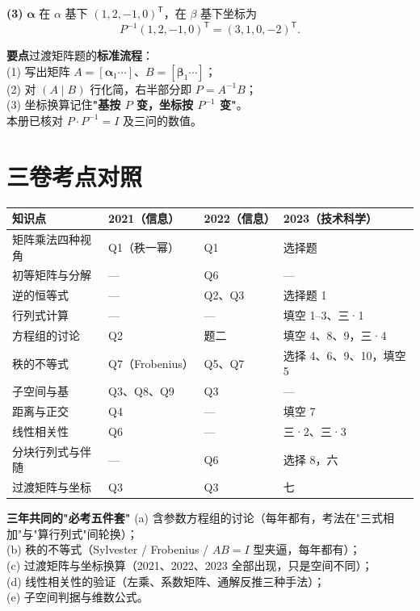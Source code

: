 \documentclass[10pt]{ctexart}
\newcommand{\TT}{^{\mathsf T}}
\begin{document}
\textbf{(3)} $\boldsymbol\alpha$ 在 $\alpha$ 基下 $(1,2,-1,0)\TT$，在 $\beta$ 基下坐标为
\[
P^{-1}(1,2,-1,0)\TT=(3,1,0,-2)\TT .
\]

\begin{tipbox}
\textbf{要点}\quad 过渡矩阵题的\textbf{标准流程}：\\
(1) 写出矩阵 $A=[\boldsymbol\alpha_1\cdots]$、$B=[\boldsymbol\beta_1\cdots]$；\\
(2) 对 $(A\mid B)$ 行化简，右半部分即 $P=A^{-1}B$；\\
(3) 坐标换算记住\textbf{"基按 $P$ 变，坐标按 $P^{-1}$ 变"}。\\
本册已核对 $P\cdot P^{-1}=I$ 及三问的数值。
\end{tipbox}

\section{三卷考点对照}

\begin{center}
\small
\begin{tabular}{@{}p{2.6cm}p{2.3cm}p{2.3cm}p{2.3cm}@{}}
\toprule
知识点 & 2021（信息） & 2022（信息） & 2023（技术科学）\\
\midrule
矩阵乘法四种视角 & Q1（秩一幂） & Q1 & 选择题\\
初等矩阵与分解 & --- & Q6 & ---\\
逆的恒等式 & --- & Q2、Q3 & 选择题 1\\
行列式计算 & --- & --- & 填空 1--3、三·1\\
方程组的讨论 & Q2 & 题二 & 填空 4、8、9，三·4\\
秩的不等式 & Q7（Frobenius） & Q5、Q7 & 选择 4、6、9、10，填空 5\\
子空间与基 & Q3、Q8、Q9 & Q3 & ---\\
距离与正交 & Q4 & --- & 填空 7\\
线性相关性 & Q6 & --- & 三·2、三·3\\
分块行列式与伴随 & --- & Q6 & 选择 8，六\\
过渡矩阵与坐标 & Q3 & Q3 & 七\\
\bottomrule
\end{tabular}
\end{center}

\begin{keybox}
\textbf{三年共同的"必考五件套"}\quad
(a) 含参数方程组的讨论（每年都有，考法在"三式相加"与"算行列式"间轮换）；\\
(b) 秩的不等式（Sylvester / Frobenius / $AB=I$ 型夹逼，每年都有）；\\
(c) 过渡矩阵与坐标换算（2021、2022、2023 全部出现，只是空间不同）；\\
(d) 线性相关性的验证（左乘、系数矩阵、通解反推三种手法）；\\
(e) 子空间判据与维数公式。
\end{keybox}
\end{document}
